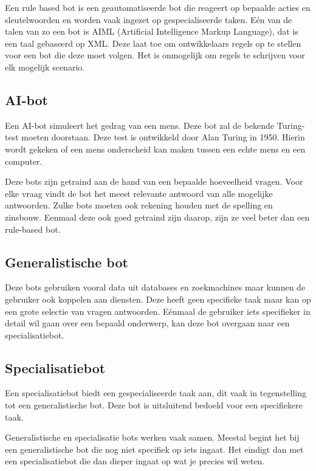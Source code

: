 Een rule based bot is een geautomatiseerde bot die reageert op bepaalde acties en sleutelwoorden en worden vaak ingezet op gespecialiseerde taken. Eén van de talen van zo een bot is AIML (Artificial Intelligence Markup Language), dat is een taal gebaseerd op XML. Deze laat toe om ontwikkelaars regels op te stellen voor een bot die deze moet volgen. Het is onmogelijk om regels te schrijven voor elk mogelijk scenario. ~\autocite{Kumar2017}

\subsection{AI-bot}
\label{AI-bot}

Een AI-bot simuleert het gedrag van een mens. Deze bot zal de bekende Turing-test moeten doorstaan. Deze test is ontwikkeld door Alan Turing in 1950. Hierin wordt gekeken of een mens onderscheid kan maken tussen een echte mens en een computer.

Deze bots zijn getraind aan de hand van een bepaalde hoeveelheid vragen. Voor elke vraag vindt de bot het meest relevante antwoord van alle mogelijke antwoorden. Zulke bots moeten ook rekening houden met de spelling en zinsbouw. Eenmaal deze ook goed getraind zijn daarop, zijn ze veel beter dan een rule-based bot.

\subsection{Generalistische bot}
\label{Generalistische bot}

Deze bots gebruiken vooral data uit databases en zoekmachines maar kunnen de gebruiker ook koppelen aan diensten. Deze heeft geen specifieke taak maar kan op een grote selectie van vragen antwoorden. Eénmaal de gebruiker iets specifieker in detail wil gaan over een bepaald onderwerp, kan deze bot overgaan naar een specialisatiebot.

\subsection{Specialisatiebot}
\label{Specialisatiebot}

Een specialisatiebot biedt een gespecialiseerde taak aan, dit vaak in tegenstelling tot een generalistische bot. Deze bot is uitsluitend bedoeld voor een specifiekere taak.

Generalistische en specialisatie bots werken vaak samen. Meestal begint het bij een generalistische bot die nog niet specifiek op iets ingaat. Het eindigt dan met een specialisatiebot die dan dieper ingaat op wat je precies wil weten.

